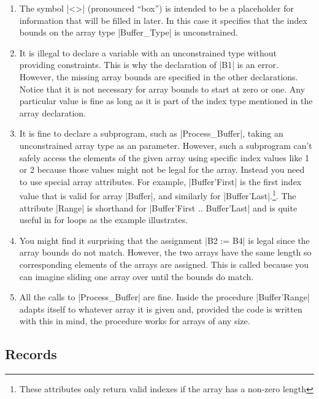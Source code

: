 \begin{enumerate}

\item The symbol |<>| (pronounced ``box'') is intended to be a placeholder for information that
  will be filled in later. In this case it specifies that the index bounds on the array type
  |Buffer_Type| is unconstrained.

\item It is illegal to declare a variable with an unconstrained type without providing
  constraints. This is why the declaration of |B1| is an error. However, the missing array
  bounds are specified in the other declarations. Notice that it is not necessary for array
  bounds to start at zero or one. Any particular value is fine as long as it is part of the
  index type mentioned in the array declaration.

\item It is fine to declare a subprogram, such as |Process_Buffer|, taking an unconstrained
  array type as an parameter. However, such a subprogram can't safely access the elements of the
  given array using specific index values like 1 or 2 because those values might not be legal
  for the array. Instead you need to use special array attributes. For example, |Buffer'First|
  is the first index value that is valid for array |Buffer|, and similarly for
  |Buffer'Last|.\footnote{These attributes only return valid indexes if the array has a non-zero
    length}. The attribute |Range| is shorthand for |Buffer'First .. Buffer'Last| and is quite
  useful in for loops as the example illustrates.

\item You might find it surprising that the assignment |B2 := B4| is legal since the array
  bounds do not match. However, the two arrays have the same length so corresponding elements of
  the arrays are assigned. This is called  because you can imagine
  sliding one array over until the bounds do match.

\item All the calls to |Process_Buffer| are fine. Inside the procedure |Buffer'Range| adapts
  itself to whatever array it is given and, provided the code is written with this in mind, the
  procedure works for arrays of any size.

\end{enumerate}

\subsection{Records}

